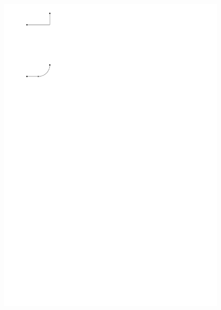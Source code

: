 \documentclass[a4paper]{scrreprt}
\theoremstyle{definition}
\begin{document}
\begin{figure}[h]
            {\includegraphics[scale=.8]{sc2_conversion/LEdge}}

\end{figure}
\end{document}
